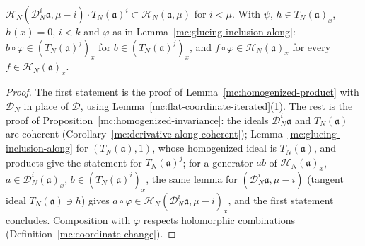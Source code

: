\begin{proposition}
\label{mc:homogenized-along-invariance}
\leanok
\(\mathcal H_N(\mathcal D_N^i\mathfrak a,\mu-i)\cdot T_N(\mathfrak a)^i\subset\mathcal H_N(\mathfrak a,\mu)\) for \(i<\mu\). With \(\psi\), \(h\in T_N(\mathfrak a)_x\), \(h(x)=0\), \(i<k\) and \(\varphi\)
as in Lemma~\ref{mc:glueing-inclusion-along}: \(b\circ\varphi\in(T_N(\mathfrak a)^j)_x\) for \(b\in(T_N(\mathfrak a)^j)_x\), and \(f\circ\varphi\in\mathcal H_N(\mathfrak a)_x\) for every
\(f\in\mathcal H_N(\mathfrak a)_x\).
\end{proposition}
\begin{proof}
\leanok
The first statement is the proof of Lemma~\ref{mc:homogenized-product} with \(\mathcal D_N\) in place of \(\mathcal D\), using
Lemma~\ref{mc:flat-coordinate-iterated}(1). The rest is the proof of Proposition~\ref{mc:homogenized-invariance}: the ideals \(\mathcal D_N^i\mathfrak a\) and \(T_N(\mathfrak a)\) are
coherent (Corollary~\ref{mc:derivative-along-coherent}); Lemma~\ref{mc:glueing-inclusion-along} for \((T_N(\mathfrak a),1)\), whose homogenized ideal is \(T_N(\mathfrak a)\), and products
give the statement for \(T_N(\mathfrak a)^j\); for a generator \(ab\) of \(\mathcal H_N(\mathfrak a)_x\), \(a\in\mathcal D_N^i(\mathfrak a)_x\), \(b\in(T_N(\mathfrak a)^i)_x\), the same lemma for
\((\mathcal D_N^i\mathfrak a,\mu-i)\) (tangent ideal \(T_N(\mathfrak a)\ni h\)) gives \(a\circ\varphi\in\mathcal H_N(\mathcal D_N^i\mathfrak a,\mu-i)_x\), and the first statement concludes.
Composition with \(\varphi\) respects holomorphic combinations (Definition~\ref{mc:coordinate-change}).
\end{proof}

